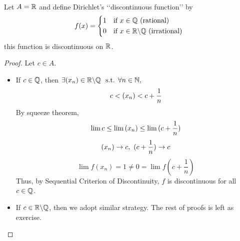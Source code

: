 \documentclass[a4paper,12pt]{article}
\begin{document}
\newpage

\begin{example}\ 

    Let \(A=\mathbb{R}\) and define Dirichlet’s ‘‘discontinuous function’’ by 
    \[f(x)=\begin{cases*}
        1 & if \(x\in\Q\) (rational)\\
        0 & if \(x\in\R\backslash\Q\) (irrational)
    \end{cases*}\]
     this function is discontinuous on \(\mathbb{R}\).
    \begin{proof}
        Let \(c\in A\).
        \begin{itemize}
            \item If \(c\in\mathbb{Q}\), then \(\ds\exists \seq{x }{n }\in \R\backslash\Q\ \st\forall n\in\N,\)
            \[c<(x _{n })<c+\frac{1 }{n }\]
            By squeeze theorem,
            \[\lim{c}\le\lim{(x _{n })}\le\lim{(c+\frac{1}{n})}\]
            \[\seq{x}{n }\rightarrow c,\ (c+\frac{1}{n})\rightarrow c\]
            \[\lim{f(x_n)}=1\neq0=\lim{f(c+\dfrac{1}{n })}\]
            Thus, by Sequential Criterion of Discontinuity, \(f\) is discontinuous for all \(c\in\mathbb{Q}\).
            \item If \(c\in\mathbb{R}\backslash\mathbb{Q}\), then we adopt similar strategy. The rest of proofs is left as exercise.
        \end{itemize}
    \end{proof}
\end{example}
\end{document}
